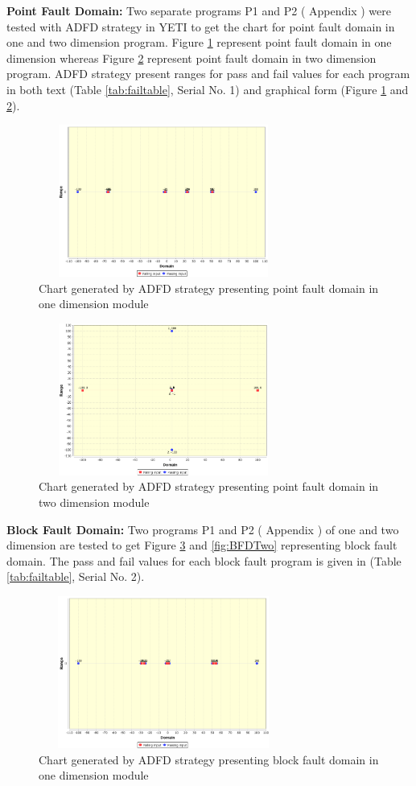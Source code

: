 \documentclass{acm_proc_article-sp}
\begin{document}
\textbf{Point Fault Domain:}  Two separate programs P1 and P2 ( Appendix ) were tested with ADFD strategy in YETI to get the chart for point fault domain in one and two dimension program. Figure \ref{fig:PFDOne} represent point fault domain in one dimension whereas Figure \ref{fig:PFDTwo} represent point fault domain in two dimension program. ADFD strategy present ranges for pass and fail values for each program in both text (Table \ref{tab:failtable}, Serial No. 1) and graphical form (Figure \ref{fig:PFDOne} and \ref{fig:PFDTwo}). 
\begin{figure}[H]
\centering
\includegraphics[width=8.2cm,height=5cm]{PFDOne.png}
\caption{Chart generated by ADFD strategy presenting point fault domain in one dimension module}
\label{fig:PFDOne}
\end{figure}

\begin{figure}[H]
\centering
\includegraphics[width=8.2cm,height=5cm]{PFDTwo.png}
\caption{Chart generated by ADFD strategy presenting point fault domain in two dimension module}
\label{fig:PFDTwo}
\end{figure}


\textbf{Block Fault Domain:} Two programs P1 and P2 ( Appendix ) of one and two dimension are tested to get Figure \ref{fig:BFDOne} and \ref{fig:BFDTwo} representing block fault domain. The pass and fail values for each block fault program is given in (Table \ref{tab:failtable}, Serial No. 2).

\begin{figure}[H]
\centering
\includegraphics[width=8.2cm,height=5cm]{BFDOne.png}
\caption{Chart generated by ADFD strategy presenting block fault domain in one dimension module}
\label{fig:BFDOne}
\end{figure}
\end{document}
